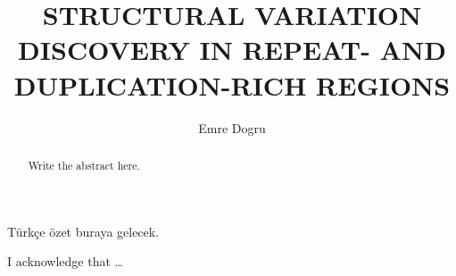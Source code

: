 \documentclass{buthesis}
\title{STRUCTURAL VARIATION DISCOVERY IN REPEAT- AND DUPLICATION-RICH REGIONS}
\author{Emre Dogru}
\begin{document}
\titlepageMS %
\signaturepageMS %

\thispagestyle{plain}
\begin{abstract}
Write the abstract here.
\end{abstract}

\begin{ozet}
 T\"urk\c ce \"ozet buraya gelecek. 
\end{ozet}

\begin{ack}
 I acknowledge that \ldots
\end{ack}

\tableofcontents
\listoffigures
\listoftables
\newpage
\newpage
%
\newpage 
\pagestyle{headings}
\makeatother
\end{document}
